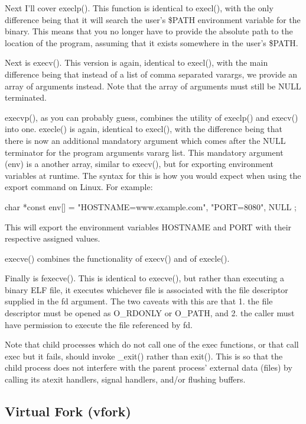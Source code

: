 \documentclass{article}
\begin{document}
Next I'll cover execlp(). This function is identical to execl(), with the only difference being that it will
search the user's \$PATH environment variable for the binary. This means that you no longer have to provide
the absolute path to the location of the program, assuming that it exists somewhere in the user's \$PATH.

Next is execv(). This version is again, identical to execl(), with the main difference being that instead of a
list of comma separated varargs, we provide an array of arguments instead. Note that the array of arguments
must still be NULL terminated.

execvp(), as you can probably guess, combines the utility of execlp() and execv() into one. execle() is again,
identical to execl(), with the difference being that there is now an additional mandatory argument which comes
after the NULL terminator for the program arguments vararg list. This mandatory argument (env) is a another
array, similar to execv(), but for exporting environment variables at runtime. The syntax for this is how you
would expect when using the export command on Linux. For example:

\begin{clst}

char *const env[] = { "HOSTNAME=www.example.com", "PORT=8080", NULL };

\end{clst}

This will export the environment variables HOSTNAME and PORT with their respective assigned values.

execve() combines the functionality of execv() and of execle().

Finally is fexecve(). This is identical to execve(), but rather than executing a binary ELF file, it executes
whichever file is associated with the file descriptor supplied in the fd argument. The two caveats with this
are that 1. the file descriptor must be opened as O\_RDONLY or O\_PATH, and 2. the caller must have permission
to execute the file referenced by fd.

Note that child processes which do not call one of the exec functions, or that call exec but it fails, should
invoke \_exit() rather than exit(). This is so that the child process does not interfere with the parent
process' external data (files) by calling its atexit handlers, signal handlers, and/or flushing buffers.

\subsection{Virtual Fork (vfork)}
\end{document}
